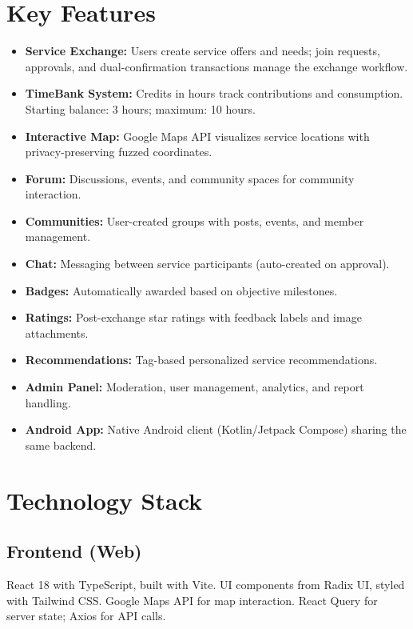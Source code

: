 \documentclass[11pt,a4paper]{report}
\begin{document}
\section{Key Features}

\begin{itemize}
    \item \textbf{Service Exchange:} Users create service offers and needs; join requests, approvals, and dual-confirmation transactions manage the exchange workflow.
    \item \textbf{TimeBank System:} Credits in hours track contributions and consumption. Starting balance: 3 hours; maximum: 10 hours.
    \item \textbf{Interactive Map:} Google Maps API visualizes service locations with privacy-preserving fuzzed coordinates.
    \item \textbf{Forum:} Discussions, events, and community spaces for community interaction.
    \item \textbf{Communities:} User-created groups with posts, events, and member management.
    \item \textbf{Chat:} Messaging between service participants (auto-created on approval).
    \item \textbf{Badges:} Automatically awarded based on objective milestones.
    \item \textbf{Ratings:} Post-exchange star ratings with feedback labels and image attachments.
    \item \textbf{Recommendations:} Tag-based personalized service recommendations.
    \item \textbf{Admin Panel:} Moderation, user management, analytics, and report handling.
    \item \textbf{Android App:} Native Android client (Kotlin/Jetpack Compose) sharing the same backend.
\end{itemize}

\section{Technology Stack}

\subsection{Frontend (Web)}

React 18 with TypeScript, built with Vite. UI components from Radix UI, styled with Tailwind CSS. Google Maps API for map interaction. React Query for server state; Axios for API calls.
\end{document}
